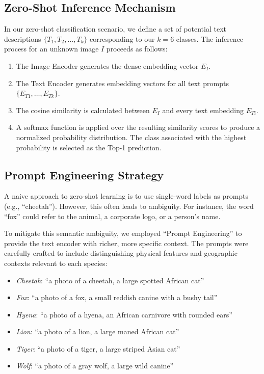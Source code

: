 \documentclass[11pt]{article}
\begin{document}
\subsection{Zero-Shot Inference Mechanism}
In our zero-shot classification scenario, we define a set of potential text descriptions $\{T_1, T_2, \dots, T_k\}$ corresponding to our $k=6$ classes. The inference process for an unknown image $I$ proceeds as follows:
\begin{enumerate}
    \item The Image Encoder generates the dense embedding vector $E_I$.
    \item The Text Encoder generates embedding vectors for all text prompts $\{E_{T1}, \dots, E_{Tk}\}$.
    \item The cosine similarity is calculated between $E_I$ and every text embedding $E_{Ti}$.
    \item A softmax function is applied over the resulting similarity scores to produce a normalized probability distribution. The class associated with the highest probability is selected as the Top-1 prediction.
\end{enumerate}

\subsection{Prompt Engineering Strategy}
A naive approach to zero-shot learning is to use single-word labels as prompts (e.g., ``cheetah''). However, this often leads to ambiguity. For instance, the word ``fox'' could refer to the animal, a corporate logo, or a person's name.

To mitigate this semantic ambiguity, we employed ``Prompt Engineering'' to provide the text encoder with richer, more specific context. The prompts were carefully crafted to include distinguishing physical features and geographic contexts relevant to each species:

\begin{itemize}
    \item \textit{Cheetah}: ``a photo of a cheetah, a large spotted African cat''
    \item \textit{Fox}: ``a photo of a fox, a small reddish canine with a bushy tail''
    \item \textit{Hyena}: ``a photo of a hyena, an African carnivore with rounded ears''
    \item \textit{Lion}: ``a photo of a lion, a large maned African cat''
    \item \textit{Tiger}: ``a photo of a tiger, a large striped Asian cat''
    \item \textit{Wolf}: ``a photo of a gray wolf, a large wild canine''
\end{itemize}
\end{document}
